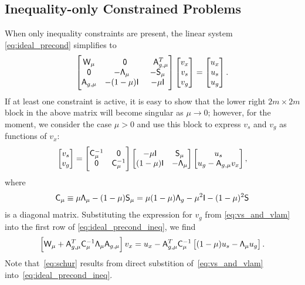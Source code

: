 \subsection{Inequality-only Constrained Problems}
When only inequality constraints are present, the linear system \eqref{eq:ideal_precond} 
simplifies to 
\begin{equation}\label{eq:ideal_precond_ineq}
  \begin{bmatrix} 
	\mathsf{W}_\mu & \phantom{-}\mathsf{0} &  \phantom{-}\mathsf{A}_{g,\mu}^T \\
	\mathsf{0}  & -\mathsf{\Lambda}_\mu & -\mathsf{S}_\mu \\
	\mathsf{A}_{g,\mu} &  -(1-\mu)\mathsf{I} & -\mu \mathsf{I}
\end{bmatrix}
\begin{bmatrix} v_x \\ v_s \\ v_g \end{bmatrix} 
= 
\begin{bmatrix} u_x \\ u_s \\ u_g \end{bmatrix}.
\end{equation}
If at least one constraint is active, it is easy to show that
the lower right $2m \times 2m$ block in the above matrix will become singular as
$\mu \rightarrow 0$; however, for the moment, we consider the case $\mu > 0$ and
use this block to express $v_s$ and $v_g$ as functions of $v_x$:
\begin{equation}\label{eq:vs_and_vlam}
  \begin{bmatrix} v_s \\ v_g \end{bmatrix}
  =
  \begin{bmatrix}
    \mathsf{C}_\mu^{-1} & \mathsf{0} \\
    \mathsf{0} & \mathsf{C}_\mu^{-1}
  \end{bmatrix}
  \begin{bmatrix}
    -\mu \mathsf{I} & \mathsf{S}_\mu \\
    (1-\mu)\mathsf{I} & -\mathsf{\Lambda}_\mu 
  \end{bmatrix}
  \begin{bmatrix} u_s \\ u_g - \mathsf{A}_{g, \mu} v_x \end{bmatrix},
\end{equation}
where 
\begin{equation*}
  \mathsf{C}_{\mu} \equiv \mu \mathsf{\Lambda}_\mu - (1-\mu) \mathsf{S}_\mu
  = \mu (1-\mu) \mathsf{\Lambda}_g - \mu^2 \mathsf{I}- (1-\mu)^2 \mathsf{S}
\end{equation*}
is a diagonal matrix.  Substituting the expression for $v_g$ from
\eqref{eq:vs_and_vlam} into the first row of \eqref{eq:ideal_precond_ineq}, we find
\begin{equation}\label{eq:schur}
\left[\mathsf{W}_\mu + \mathsf{A}_{g, \mu}^T \mathsf{C}_\mu^{-1} \mathsf{\Lambda}_\mu \mathsf{A}_{g,\mu}
  \right] v_x = u_x - \mathsf{A}_{g,\mu}^T \mathsf{C}_{\mu}^{-1} \left[(1-\mu) u_s -
  \mathsf{\Lambda}_\mu u_g \right].
\end{equation}
Note that~\eqref{eq:schur} results from direct substition of~\eqref{eq:vs_and_vlam} into~\eqref{eq:ideal_precond_ineq}.

